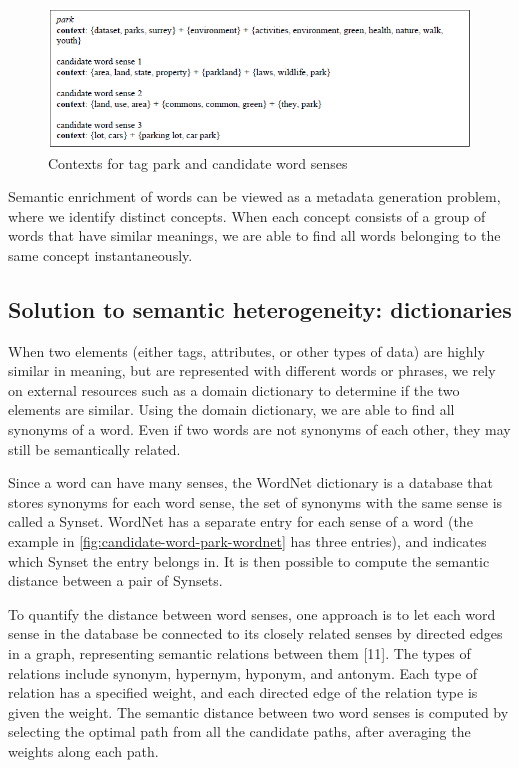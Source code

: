 \begin{figure}
    \centering
    \includegraphics[width=5in]{figures/contexts-park-candidate.png}
    \caption{Contexts for tag park and candidate word senses}
    \label{fig:contexts-park-candidate}
\end{figure}

Semantic enrichment of words can be viewed as a metadata generation problem, where we identify distinct concepts. When each concept consists of a group of words that have similar meanings, we are able to find all words belonging to the same concept instantaneously.

\subsection{Solution to semantic heterogeneity: dictionaries}
\label{ssec:SolutionToSemanticHeterogeneityDdictionaries}

When two elements (either tags, attributes, or other types of data) are highly similar in meaning, but are represented with different words or phrases, we rely on external resources such as a domain dictionary to determine if the two elements are similar. Using the domain dictionary, we are able to find all synonyms of a word. Even if two words are not synonyms of each other, they may still be semantically related.

Since a word can have many senses, the WordNet dictionary is a database that stores synonyms for each word sense, the set of synonyms with the same sense is called a Synset. WordNet has a separate entry for each sense of a word (the example in \autoref{fig:candidate-word-park-wordnet} has three entries), and indicates which Synset the entry belongs in. It is then possible to compute the semantic distance between a pair of Synsets.

To quantify the distance between word senses, one approach is to let each word sense in the database be connected to its closely related senses by directed edges in a graph, representing semantic relations between them \cite{cruz2005role}[11]. The types of relations include synonym, hypernym, hyponym, and antonym. Each type of relation has a specified weight, and each directed edge of the relation type is given the weight. The semantic distance between two word senses is computed by selecting the optimal path from all the candidate paths, after averaging the weights along each path.

